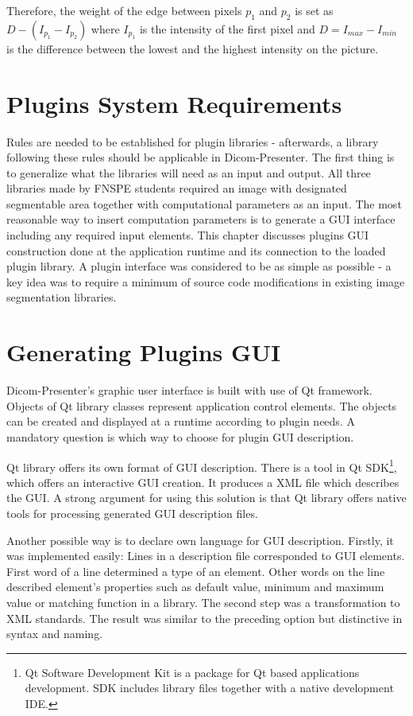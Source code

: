 Therefore, the weight of the edge between pixels $p_{1}$ and $p_{2}$ is set as $D - \left(I_{p_{1}} - I_{p_{2}} \right)$ where $I_{p_{1}}$ is the intensity of the first pixel and $D = I_{max} - I_{min}$ is the difference between the lowest and the highest intensity on the picture.

\section{Plugins System Requirements}
Rules are needed to be established for plugin libraries - afterwards, a library following these rules should be applicable in Dicom-Presenter. The first thing is to generalize what the libraries will need as an input and output. All three libraries made by FNSPE students required an image with designated segmentable area together with computational parameters as an input. The most reasonable way to insert computation parameters is to generate a GUI interface including any required input elements. This chapter discusses plugins GUI construction done at the application runtime and its connection to the loaded plugin library. A plugin interface was considered to be as simple as possible - a key idea was to require a minimum of source code modifications in existing image segmentation libraries.

\section{Generating Plugins GUI}

Dicom-Presenter's graphic user interface is built with use of Qt framework. Objects of Qt library classes represent application control elements. The objects can be created and displayed at a runtime according to plugin needs. A mandatory question is which way to choose for plugin GUI description.

Qt library offers its own format of GUI description. There is a tool in Qt SDK\footnote{Qt Software Development Kit is a package for Qt based applications development. SDK includes library files together with a native development IDE.}, which offers an interactive GUI creation. It produces a XML file which describes the GUI. A strong argument for using this solution is that Qt library offers native tools for processing generated GUI description files.

Another possible way is to declare own language for GUI description. Firstly, it was implemented easily: Lines in a description file corresponded to GUI elements. First word of a line determined a type of an element. Other words on the line described element's properties such as default value, minimum and maximum value or matching function in a library. The second step was a transformation to XML standards. The result was similar to the preceding option but distinctive in syntax and naming. 

